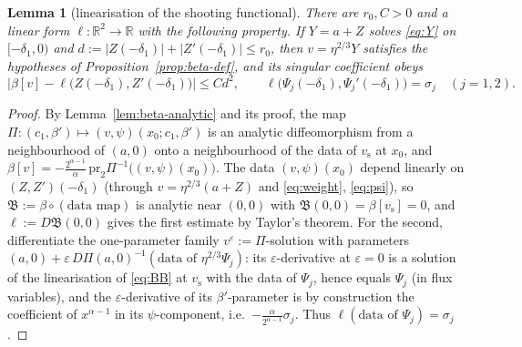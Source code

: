 \documentclass[11pt,a4paper]{amsart}
\newtheorem{lemma}[theorem]{Lemma}
\theoremstyle{definition}
\theoremstyle{remark}
\newcommand{\R}{\mathbb{R}}
\newcommand{\eps}{\varepsilon}
\newcommand{\vs}{v_{\mathrm{s}}}
\begin{document}
\begin{lemma}[linearisation of the shooting functional]\label{lem:beta-lin}
There are $r_0,C>0$ and a linear form $\ell:\R^2\to\R$ with the following property.  If $Y=a+Z$ solves \eqref{eq:Y} on $[-\delta_1,0)$ and $d:=|Z(-\delta_1)|+|Z'(-\delta_1)|\le r_0$, then $v=\eta^{2/3}Y$ satisfies the hypotheses of Proposition~\ref{prop:beta-def}, and its singular coefficient obeys
\[
\big|\beta[v]-\ell\big(Z(-\delta_1),Z'(-\delta_1)\big)\big|\le C d^2 ,\qquad \ell\big(\Psi_j(-\delta_1),\Psi_j'(-\delta_1)\big)=\sigma_j\quad(j=1,2).
\]
\end{lemma}
\begin{proof}
By Lemma~\ref{lem:beta-analytic} and its proof, the map $\Pi:(c_1,\beta')\mapsto(v,\psi)(x_0;c_1,\beta')$ is an analytic diffeomorphism from a neighbourhood of $(a,0)$ onto a neighbourhood of the data of $\vs$ at $x_0$, and $\beta[v]=-\frac{2^{\alpha-1}}{\alpha}\,\mathrm{pr}_2\Pi^{-1}\big((v,\psi)(x_0)\big)$.  The data $(v,\psi)(x_0)$ depend linearly on $(Z,Z')(-\delta_1)$ (through $v=\eta^{2/3}(a+Z)$ and \eqref{eq:weight}, \eqref{eq:psi}), so $\mathfrak B:=\beta\circ(\text{data map})$ is analytic near $(0,0)$ with $\mathfrak B(0,0)=\beta[\vs]=0$, and $\ell:=D\mathfrak B(0,0)$ gives the first estimate by Taylor's theorem.  For the second, differentiate the one-parameter family $v^\eps:=\Pi$-solution with parameters $(a,0)+\eps\,D\Pi(a,0)^{-1}(\text{data of }\eta^{2/3}\Psi_j)$: its $\eps$-derivative at $\eps=0$ is a solution of the linearisation of \eqref{eq:BB} at $\vs$ with the data of $\Psi_j$, hence equals $\Psi_j$ (in flux variables), and the $\eps$-derivative of its $\beta'$-parameter is by construction the coefficient of $x^{\alpha-1}$ in its $\psi$-component, i.e.\ $-\frac{\alpha}{2^{\alpha-1}}\sigma_j$.  Thus $\ell(\text{data of }\Psi_j)=\sigma_j$.
\end{proof}
\end{document}
